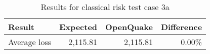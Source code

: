 \begin{table}[htbp]

\centering
\begin{tabular}{ l r r r }

\hline
\rowcolor{anti-flashwhite}
\bf{Result} & \bf{Expected} & \bf{OpenQuake} & \bf{Difference}\\
\hline
Average loss & 2,115.81 & 2,115.81 & 0.00\% \\
\hline
\end{tabular}

\caption{Results for classical risk test case 3a}
\label{tab:result-cr-3a}
\end{table}